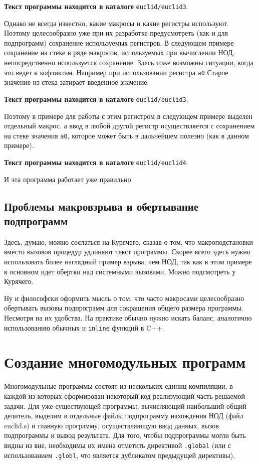 \textbf{Текст программы находится в каталоге} \verb|euclid/euclid3|.

Однако не всегда известно, какие макросы и какие регистры используют. Поэтому целесообразно уже при их разработке предусмотреть (как и для подпрограмм) сохранение используемых регистров. В следующем примере сохранение на стеке в ряде макросов, используемых при вычислении НОД, непосредственно используется сохранение. Здесь тоже возможны ситуации, когда это ведет к кофликтам. Например при использовании регистра \verb|a0| Старое значение из стека затирает введенное значение.

\textbf{Текст программы находится в каталоге} \verb|euclid/euclid3|.

Поэтому в примере для работы с этим регистром в следующем примере выделен отдельный макрос. а ввод в любой другой регистр осуществляется с сохранением на стеке значения \verb|a0|, которое может быть в дальнейшем полезно (как в данном примере).

\textbf{Текст программы находится в каталоге} \verb|euclid/euclid4|.

И эта программа работает уже правильно

\subsection{Проблемы макровзрыва и обертывание подпрограмм}

Здесь, думаю, можно сослаться на Курячего, сказав о том, что макроподстановки вместо вызовов процедур удлиняют текст программы. Скорее всего здесь нужно использовать более наглядный пример взрыва, чем НОД, так как в этом примере в основном идет обертки над системными вызовами. Можно подсмотреть у Курячего.

Ну и философски оформить мысль о том, что часто макросами целесообразно обертывать вызовы подпрограмм для сокращения общего размера программы. Несмотря на их удобства. На практике обычно нужно искать баланс, аналогично использованию обычных и \verb|inline| функций в C++.

\section{Создание многомодульных программ}

Многомодульные программы состоят из нескольких единиц компиляции, в каждой из которых сформирован некоторый код реализующий часть решаемой задачи. Для уже существующей программы, вычисляющий наибольший общий делитель, выделим в отдельные файлы подпрограмму нахождения НОД (файл euclid.s) и главную программу, осуществляющую ввод данных, вызов подпрограммы и вывод результата. Для того, чтобы подпрограммы могли быть видны из вне, необходимы их имена отметить директивой \verb|.global| (или с использованием \verb|.globl|, что является дубликатом предыдущей директивы).

